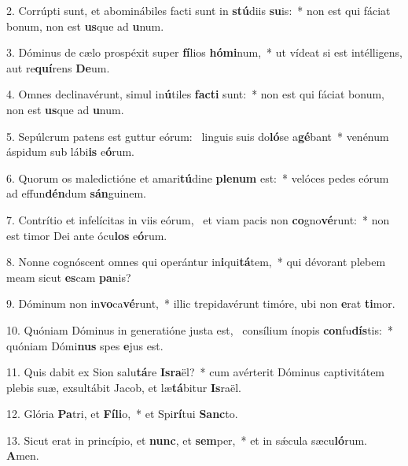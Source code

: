 2. Corrúpti sunt, et abominábiles facti sunt in \textbf{stú}diis \textbf{su}is:~*  non est qui fáciat bonum, non est \textbf{us}que ad \textbf{u}num.\

3. Dóminus de cælo prospéxit super \textbf{fí}lios \textbf{hó}\textbf{mi}num,~*  ut vídeat si est intélligens, aut re\textbf{quí}rens \textbf{De}um.\

4. Omnes declinavérunt, simul in\textbf{ú}tiles \textbf{fac}\textbf{ti} sunt:~*  non est qui fáciat bonum, non est \textbf{us}que ad \textbf{u}num.\

5. Sepúlcrum patens est guttur eórum: \dag\  linguis suis do\textbf{ló}se a\textbf{gé}bant~*  venénum áspidum sub lábi\textbf{is} e\textbf{ó}rum.\

6. Quorum os maledictióne et amari\textbf{tú}dine \textbf{ple}\textbf{num} est:~*  velóces pedes eórum ad effun\textbf{dén}dum \textbf{sán}guinem.\

7. Contrítio et infelícitas in viis eórum, \dag\  et viam pacis non \textbf{co}gno\textbf{vé}runt:~*  non est timor Dei ante ócu\textbf{los} e\textbf{ó}rum.\

8. Nonne cognóscent omnes qui operántur in\textbf{i}qui\textbf{tá}tem,~*  qui dévorant plebem meam sicut \textbf{es}cam \textbf{pa}nis?\

9. Dóminum non in\textbf{vo}ca\textbf{vé}runt,~*  illic trepidavérunt timóre, ubi non \textbf{e}rat \textbf{ti}mor.\

10. Quóniam Dóminus in generatióne justa est, \dag\  consílium ínopis \textbf{con}fu\textbf{dís}tis:~*  quóniam Dómi\textbf{nus} spes \textbf{e}jus est.\

11. Quis dabit ex Sion salu\textbf{tá}re \textbf{Is}\textbf{ra}ël?~*  cum avérterit Dóminus captivitátem plebis suæ, exsultábit Jacob, et læ\textbf{tá}bitur \textbf{Is}raël.\

12. Glória \textbf{Pa}tri, et \textbf{Fí}\textbf{li}o,~*  et Spi\textbf{rí}tui \textbf{Sanc}to.\

13. Sicut erat in princípio, et \textbf{nunc}, et \textbf{sem}per,~*  et in sǽcula sæcu\textbf{ló}rum. \textbf{A}men.\

